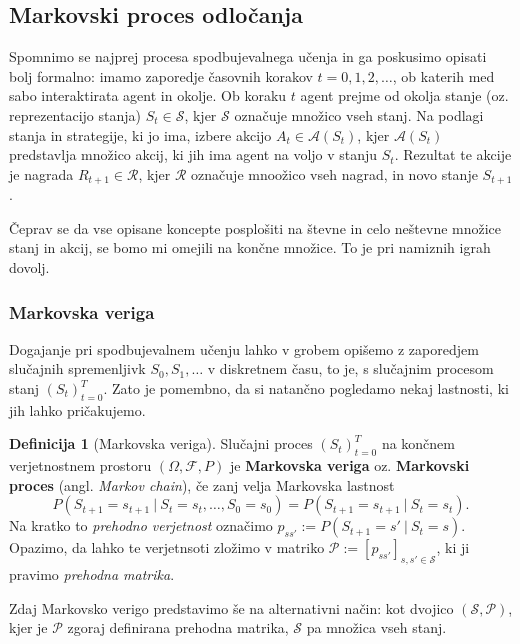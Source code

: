 \documentclass[12pt,a4paper]{amsart}
\theoremstyle{definition} %
\newtheorem{definicija}{Definicija}[section]
\theoremstyle{plain} %
\begin{document}
\subsection{Markovski proces odločanja}
Spomnimo se najprej procesa spodbujevalnega učenja in ga poskusimo opisati bolj formalno: 
imamo zaporedje časovnih korakov $t = 0, 1, 2, \dots$, ob katerih med sabo interaktirata agent 
in okolje. Ob koraku $t$ agent prejme od okolja stanje (oz. reprezentacijo stanja) $S_t \in 
\mathcal{S}$, kjer $\mathcal{S}$ označuje množico vseh stanj. Na podlagi stanja in strategije, 
ki jo ima, izbere akcijo $A_t \in \mathcal{A}(S_t)$, kjer $\mathcal{A}(S_t)$ predstavlja 
množico akcij, ki jih ima agent na voljo v stanju $S_t$. Rezultat te akcije je nagrada $R_{t+1} 
\in \mathcal{R}$, kjer $\mathcal{R}$ označuje mnoožico vseh nagrad, in novo stanje $S_{t+1}$.

Čeprav se da vse opisane koncepte posplošiti na števne in celo neštevne množice stanj in akcij, 
se bomo mi omejili na končne množice. To je pri namiznih igrah dovolj.

\subsubsection{Markovska veriga}
Dogajanje pri spodbujevalnem učenju lahko v grobem opišemo z zaporedjem slučajnih spremenljivk $S_0,
S_1, \dots$ v diskretnem času, to je, s slučajnim procesom stanj $(S_t)_{t=0}^T$. Zato je pomembno, 
da si natančno pogledamo nekaj lastnosti, ki jih lahko pričakujemo. 

\begin{definicija}[Markovska veriga]
    Slučajni proces $(S_t)_{t=0}^T$ na končnem verjetnostnem prostoru 
    $(\Omega, \mathcal{F}, P)$ je \textbf{Markovska veriga} oz. \textbf{Markovski proces} (angl. 
    \textit{Markov chain}), če zanj velja Markovska lastnost
    $$
    P(S_{t+1} = s_{t+1}~|~S_{t} = s_{t}, \dots, S_0 = s_0) = P(S_{t+1} = s_{t+1}~|~S_{t} = s_{t}).
    $$
    Na kratko to \textit{prehodno verjetnost} označimo $p_{ss'} := P(S_{t+1} = s'~|~S_{t} = s)$.
    Opazimo, da lahko te verjetnsoti zložimo v matriko $\mathcal{P} := 
    [p_{ss'}]_{s,s'\in \mathcal{S} }$, ki ji pravimo \textit{prehodna matrika}.

    Zdaj Markovsko verigo predstavimo še na alternativni način: kot dvojico $(\mathcal{S}, 
    \mathcal{P})$, kjer je $\mathcal{P}$ zgoraj definirana prehodna matrika, $\mathcal{S}$ pa 
    množica vseh stanj.
\end{definicija}
\end{document}
